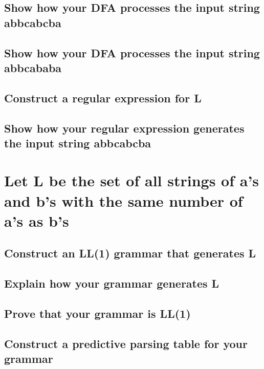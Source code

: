 \documentclass{article}
\begin{document}
\subsection[Input String: abbcabcba]{Show how your DFA processes the input 
string abbcabcba}

\subsection[Input String: abbcababa]{Show how your DFA processes the input 
string abbcababa}

\subsection[Regular Expression for L]{Construct a regular expression for L}

\subsection[Regular Expression generate: abbcabcba]{Show how your regular 
expression generates the input string abbcabcba}





\newpage
\section[Problem 3]{Let L be the set of all strings of a's and b's with the 
same number of a's as b's}
\subsection[LL1 Grammar]{Construct an LL(1) grammar that generates L}

\subsection[Generation Explanation]{Explain how your grammar generates L}

\subsection[Proof of LL(1)]{Prove that your grammar is LL(1) }

\subsection[Predictive Parser]{Construct a predictive parsing table for your 
grammar }
\end{document}
